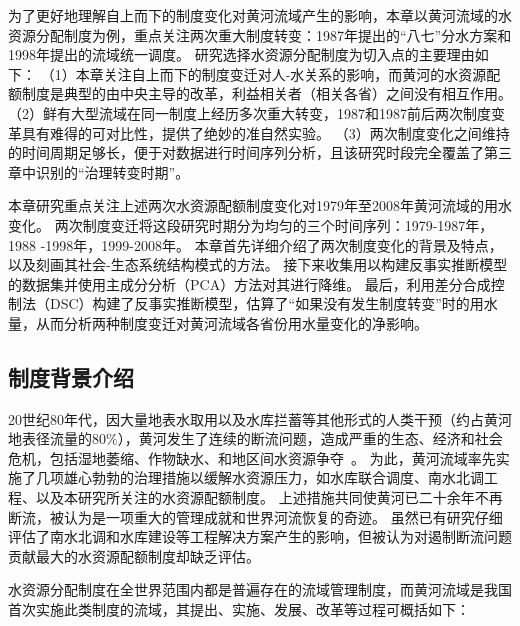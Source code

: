 
为了更好地理解自上而下的制度变化对黄河流域产生的影响，本章以黄河流域的水资源分配制度为例，重点关注两次重大制度转变：1987年提出的``八七''分水方案和1998年提出的流域统一调度。
研究选择水资源分配制度为切入点的主要理由如下：
（1）本章关注自上而下的制度变迁对人-水关系的影响，而黄河的水资源配额制度是典型的由中央主导的改革，利益相关者（相关各省）之间没有相互作用。
（2）鲜有大型流域在同一制度上经历多次重大转变，1987和1987前后两次制度变革具有难得的可对比性，提供了绝妙的准自然实验。
（3）两次制度变化之间维持的时间周期足够长，便于对数据进行时间序列分析，且该研究时段完全覆盖了第三章中识别的“治理转变时期”。

本章研究重点关注上述两次水资源配额制度变化对1979年至2008年黄河流域的用水变化。
两次制度变迁将这段研究时期分为均匀的三个时间序列：1979-1987年，1988 -1998年，1999-2008年。
本章首先详细介绍了两次制度变化的背景及特点，以及刻画其社会-生态系统结构模式的方法。
接下来收集用以构建反事实推断模型的数据集并使用主成分分析（PCA）方法对其进行降维。
最后，利用差分合成控制法（DSC）构建了反事实推断模型\cite{arkhangelsky2021}，估算了“如果没有发生制度转变”时的用水量，从而分析两种制度变迁对黄河流域各省份用水量变化的净影响。

\subsection{制度背景介绍}\label{sec:yrb}

20世纪80年代，因大量地表水取用以及水库拦蓄等其他形式的人类干预（约占黄河地表径流量的$80\%$），黄河发生了连续的断流问题，造成严重的生态、经济和社会危机，包括湿地萎缩、作物缺水、和地区间水资源争夺~\cite{fu2021}。
为此，黄河流域率先实施了几项雄心勃勃的治理措施以缓解水资源压力，如水库联合调度、南水北调工程、以及本研究所关注的水资源配额制度\cite{long2020, wang2019b}。
上述措施共同使黄河已二十余年不再断流，被认为是一项重大的管理成就和世界河流恢复的奇迹。
虽然已有研究仔细评估了南水北调和水库建设等工程解决方案产生的影响\cite{long2020,wang2019c}，但被认为对遏制断流问题贡献最大的水资源配额制度却缺乏评估\cite{wang2019b}。

水资源分配制度在全世界范围内都是普遍存在的流域管理制度，而黄河流域是我国首次实施此类制度的流域，其提出、实施、发展、改革等过程可概括如下\cite{wang2019b}：

